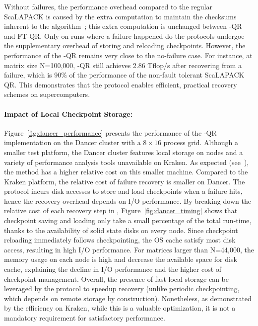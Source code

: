 Without failures, the performance overhead compared to the regular
ScaLAPACK is caused by the extra computation to maintain the checksums inherent to the \abft
algorithm~\cite{pengduppopp12}; this extra computation is unchanged between \cof-QR and
FT-QR. Only on runs where a failure happened do the \cof protocols
undergoe the supplementary overhead of storing and reloading
checkpoints. However, the performance of the \cof-QR remains very
close to the no-failure case. For instance, at matrix size N=100,000,
\cof-QR still achieves 2.86 Tflop/s after recovering from a failure,
which is 90\% of the performance of the non-fault tolerant ScaLAPACK QR.
This demonstrates that the \cof protocol enables efficient, practical
recovery schemes on supercomputers.

\paragraph*{Impact of Local Checkpoint Storage:}

Figure~\ref{fig:dancer_performance} presents the performance of the \cof-QR 
implementation on the Dancer cluster with a $8\times 16$ process
grid. Although a smaller test platform, the Dancer cluster features
local storage on nodes and a variety of performance analysis tools
unavailable on Kraken. As expected (see~\cite{pengduppopp12}), the \abft
method has a higher relative cost on this smaller machine. Compared to
the Kraken platform, the relative cost of \cof failure recovery is
smaller on Dancer. The \cof protocol incurs disk accesses to store and
load checkpoints when a failure hits, hence the recovery overhead
depends on I/O performance. By breaking down the relative cost of each
recovery step in \cof, Figure~\ref{fig:dancer_timing} shows that
checkpoint saving and loading only take a small percentage of the total
run-time, thanks to the availability of solid state disks on every node.
Since checkpoint reloading immediately follows checkpointing, the OS
cache satisfy most disk access, resulting in high I/O performance. For
matrices larger than N=44,000, the memory usage on each node is high and
decrease the available space for disk cache, explaining the decline in
I/O performance and the higher cost of checkpoint management. Overall,
the presence of fast local storage can be leveraged by the \cof protocol
to speedup recovery (unlike periodic checkpointing, which
depends on remote storage by construction). Nonetheless, as demonstrated by the
efficiency on Kraken, while this is a valuable optimization, it is not a
mandatory requirement for satisfactory performance.

